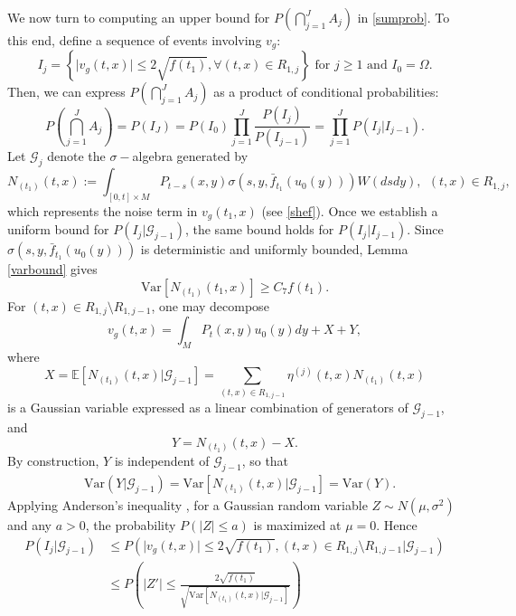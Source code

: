 \documentclass[12pt]{amsart}
\numberwithin{equation}{section}
\newcommand{\E}{\mathbb{E}}
\newcommand{\1}{\mathbf{1}}
\begin{document}
We now turn to computing an upper bound for $P\left(\bigcap\limits_{j=1}^{J}A_j\right)$ in \eqref{sumprob}. To this end, define a sequence of events involving $v_g$:
\[I_j=\left\lbrace\vert v_g(t,x)\vert\leq 2\sqrt{f(t_1)}, \forall(t,x)\in R_{1,j}\right\rbrace\text{ for $j\geq 1$ and $I_{0}=\Omega$.}\]
Then, we can express $P\left(\bigcap\limits_{j=1}^{J}A_j\right)$ as a product of conditional probabilities:
\begin{equation}
\label{Acond}
P\left(\bigcap_{j=1}^{J}A_j\right)=P(I_{J})=P(I_{0})\prod_{j=1}^{J}\frac{P(I_j)}{P(I_{j-1})}=\prod_{j=1}^{J}P(I_j\vert I_{j-1}).
\end{equation}
Let $\mathcal{G}_j$ denote the $\sigma-$algebra generated by 
\[N_{(t_1)}(t,x):=\int_{[0,t]\times M} P_{t-s}(x,y)\sigma(s,y,\bar{f}_{t_1}(u_0(y)))W(dsdy),~~(t,x)\in R_{1,j},\]
which represents the noise term in $v_g(t_1,x)$ (see \eqref{shef}). Once we establish a uniform bound for $P\left(I_j\vert \mathcal{G}_{j-1}\right)$, the same bound holds for $P\left(I_j\vert I_{j-1}\right)$. Since $\sigma(s,y,\bar{f}_{t_1}(u_0(y)))$ is deterministic and uniformly bounded, Lemma \ref{varbound} gives
\begin{equation*}
\textrm{Var}\left[N_{(t_1)}(t_1,x)\right]\geq C_7 f(t_1).
\end{equation*}
For $(t,x)\in R_{1,j}\setminus R_{1,j-1}$, one may decompose
\begin{equation}
\label{vgdecom}
v_g(t,x)=\int_{M}P_{t}(x,y)u_0(y)dy+X+Y,
\end{equation}
where 
\begin{equation}
\label{Xdecom}
X=\E\left[N_{(t_1)}(t,x)\vert \mathcal{G}_{j-1}\right]=\sum_{(t,x)\in R_{1,j-1}}\eta^{(j)}(t,x)N_{(t_1)}(t,x)
\end{equation}
is a Gaussian variable expressed as a linear combination of generators of $\mathcal{G}_{j-1}$, and
\begin{equation*}
Y=N_{(t_1)}(t,x)-X.
\end{equation*}
By construction, $Y$ is independent of $\mathcal{G}_{j-1}$, so that
\begin{align*}
&\textrm{Var}(Y\vert\mathcal{G}_{j-1})=\textrm{Var}[N_{(t_1)}(t,x)\vert \mathcal{G}_{j-1}]=\textrm{Var}(Y).
\end{align*}
Applying Anderson's inequality \cite{anderson1955integral}, for a Gaussian random variable $Z \sim N(\mu,\sigma^2)$ and any $a >0$, the probability $P(\vert Z\vert \leq a)$ is maximized at $\mu = 0$. Hence
\begin{equation}
\label{probA}
\begin{split}
P\left(I_j\vert \mathcal{G}_{j-1}\right)&\leq P\left(\vert v_g(t,x)\vert\leq 2\sqrt{f(t_1)}, (t,x)\in R_{1,j}\setminus R_{1,j-1}\bigg| \mathcal{G}_{j-1}\right)\\
&\leq P\left(\left\vert Z'\right\vert\leq \frac{2\sqrt{f(t_1)}}{\sqrt{\textrm{Var}[N_{(t_1)}(t,x)\vert \mathcal{G}_{j-1}]}}\right)
\end{split}
\end{equation}
\end{document}
